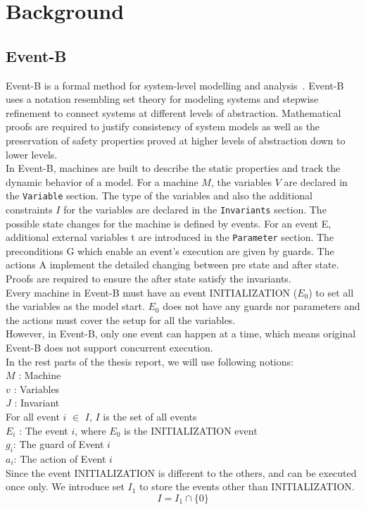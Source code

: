 
\section{Background}
\label{sec:Background}


\subsection{Event-B}
Event-B is a formal method for system-level modelling and analysis~\cite{FIXME:something from Abrial}. Event-B uses a notation resembling  set theory for modeling systems and stepwise refinement to connect systems at different levels of abstraction. Mathematical proofs are required to justify consistency of system models as well as the preservation of safety properties proved at higher levels of abstraction down to lower levels.\\
In Event-B, machines are built to describe the static properties and track the dynamic behavior of a model. For a machine $M$, the variables $V$ are declared in the \texttt{Variable} section. The type of the variables and also the additional constraints $I$ for the variables are declared in the \texttt{Invariants} section.
The possible state changes for the machine is defined by events. For an event E, additional external variables t are introduced in the \texttt{Parameter} section. The preconditions G which enable an event’s execution are given by guards. The actions A implement the detailed changing between pre state and after state. Proofs are required to ensure the after state satisfy the invariants.\\
Every machine in Event-B must have an event INITIALIZATION ($E_{0}$) to set all the variables as the model start. $E_{0}$ does not have any guards nor parameters and the actions must cover the setup for all the variables.\\
However, in Event-B, only one event can happen at a time, which means original Event-B does not support concurrent execution.\\
In the rest parts of the thesis report, we will use following notions:\\
$M$ : Machine\\
$v$ : Variables\\
$J$ : Invariant\\
For all event $i$ $\in$ $I$, $I$ is the set of all events\\
$E_{i}$ : The event $i$, where $E_0$ is the INITIALIZATION event\\
$g_{i}$: The guard of Event $i$\\
$a_{i}$: The action of Event $i$\\
Since the event INITIALIZATION is different to the others, and can be executed once only. We introduce set $I_1$ to store the events other than INITIALIZATION.
\begin{displaymath}
  I = I_1\cap\{{0}\}
\end{displaymath}
